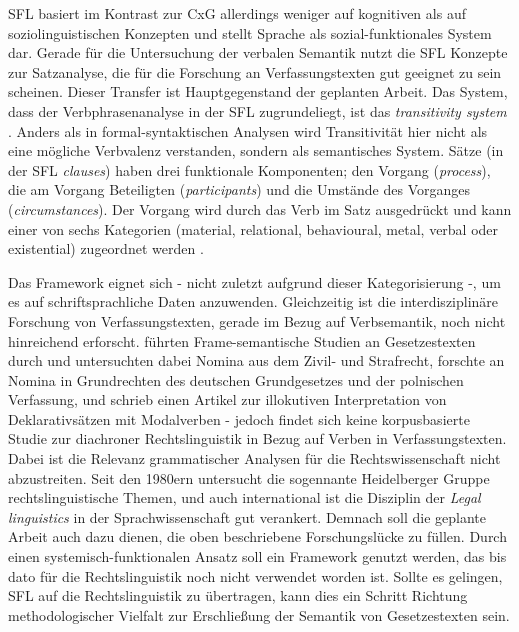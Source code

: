 SFL basiert im Kontrast zur CxG allerdings weniger auf kognitiven als auf soziolinguistischen Konzepten und stellt Sprache als sozial-funktionales System dar. Gerade für die Untersuchung der verbalen Semantik nutzt die SFL Konzepte zur Satzanalyse, die für die Forschung an Verfassungstexten gut geeignet zu sein scheinen. Dieser Transfer ist Hauptgegenstand der geplanten Arbeit. Das System, dass der Verbphrasenanalyse in der SFL zugrundeliegt, ist das \textit{transitivity system} \citep[170]{Halliday2004}. Anders als in formal-syntaktischen Analysen wird Transitivität hier nicht als eine mögliche Verbvalenz verstanden, sondern als semantisches System. Sätze (in der SFL \textit{clauses}) haben drei funktionale Komponenten; den Vorgang (\textit{process}), die am Vorgang Beteiligten (\textit{participants}) und die Umstände des Vorganges (\textit{circumstances}). Der Vorgang wird durch das Verb im Satz ausgedrückt und kann einer von sechs Kategorien (material, relational, behavioural, metal, verbal oder existential) zugeordnet werden \citep[171]{Halliday2004}.

Das Framework eignet sich - nicht zuletzt aufgrund dieser Kategorisierung -, um es auf schriftsprachliche Daten anzuwenden. Gleichzeitig ist die interdisziplinäre Forschung von Verfassungstexten, gerade im Bezug auf Verbsemantik, noch nicht hinreichend erforscht. \cite{Busse2015,BusseEtAl2018} führten Frame-semantische Studien an Gesetzestexten durch und untersuchten dabei Nomina aus dem Zivil- und Strafrecht, \cite{Cirko2022} forschte an Nomina in Grundrechten des deutschen Grundgesetzes und der polnischen Verfassung, und \cite{Sayatz1991} schrieb einen Artikel zur illokutiven Interpretation von Deklarativsätzen mit Modalverben - jedoch findet sich keine korpusbasierte Studie zur diachroner Rechtslinguistik in Bezug auf Verben in Verfassungstexten. Dabei ist die Relevanz grammatischer Analysen für die Rechtswissenschaft nicht abzustreiten. Seit den 1980ern untersucht die sogennante Heidelberger Gruppe rechtslinguistische Themen, und auch international ist die Disziplin der \textit{Legal linguistics} in der Sprachwissenschaft gut verankert. Demnach soll die geplante Arbeit auch dazu dienen, die oben beschriebene Forschungslücke zu füllen. Durch einen systemisch-funktionalen Ansatz soll ein Framework genutzt werden, das bis dato für die Rechtslinguistik noch nicht verwendet worden ist. Sollte es gelingen, SFL auf die Rechtslinguistik zu übertragen, kann dies ein Schritt Richtung methodologischer Vielfalt zur Erschließung der Semantik von Gesetzestexten sein.

